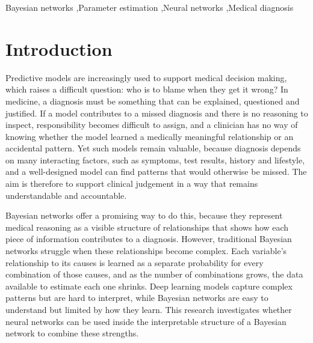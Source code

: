 \documentclass[a4paper,fleqn]{cas-dc}
\begin{document}
\begin{keywords}
Bayesian networks \sep Parameter estimation \sep Neural networks \sep Medical diagnosis
\end{keywords}

\maketitle

\section{Introduction}\label{sec:intro}

Predictive models are increasingly used to support medical decision making, which raises a difficult question: who is to blame when they get it wrong? In medicine, a diagnosis must be something that can be explained, questioned and justified. If a model contributes to a missed diagnosis and there is no reasoning to inspect, responsibility becomes difficult to assign, and a clinician has no way of knowing whether the model learned a medically meaningful relationship or an accidental pattern. Yet such models remain valuable, because diagnosis depends on many interacting factors, such as symptoms, test results, history and lifestyle, and a well-designed model can find patterns that would otherwise be missed. The aim is therefore to support clinical judgement in a way that remains understandable and accountable.

Bayesian networks offer a promising way to do this, because they represent medical reasoning as a visible structure of relationships that shows how each piece of information contributes to a diagnosis. However, traditional Bayesian networks struggle when these relationships become complex. Each variable's relationship to its causes is learned as a separate probability for every combination of those causes, and as the number of combinations grows, the data available to estimate each one shrinks. Deep learning models capture complex patterns but are hard to interpret, while Bayesian networks are easy to understand but limited by how they learn. This research investigates whether neural networks can be used inside the interpretable structure of a Bayesian network to combine these strengths.
\end{document}

